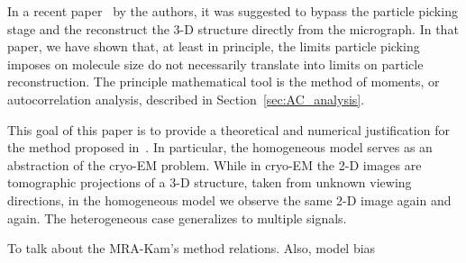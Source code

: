 \documentclass[12pt]{article}
\newcommand{\1}{\mathbf{1}}
\newcommand{\TODO}[1]{{\color{red}{[#1]}}}
\theoremstyle{plain}
\theoremstyle{definition}
\theoremstyle{remark}
\theoremstyle{plain}
\theoremstyle{remark}
\theoremstyle{plain}
\theoremstyle{plain}
\begin{document}
In a recent paper~\cite{bendory2018toward} by the authors, it was suggested to bypass the particle picking stage and the reconstruct the 3-D structure directly from the micrograph.
In that paper, we have shown that, at least in principle, the limits particle picking imposes on molecule size do not necessarily  translate into limits on particle reconstruction.
The principle mathematical tool is the method of moments, or autocorrelation analysis, described in Section~\ref{sec:AC_analysis}.

This goal of  this paper is to provide a theoretical and numerical justification for the method proposed in~\cite{bendory2018toward}.  
In particular, the homogeneous  model serves as an abstraction of the cryo-EM problem. While in cryo-EM the 2-D images are tomographic projections of a 3-D structure, taken from unknown viewing directions, in the homogeneous model we observe the same 2-D image again and again. The heterogeneous case generalizes to multiple signals. 

To talk about the MRA-Kam's method relations. Also, model bias 
\TODO{Where do we discuss the limits of detection?}
%
%
\end{document}
